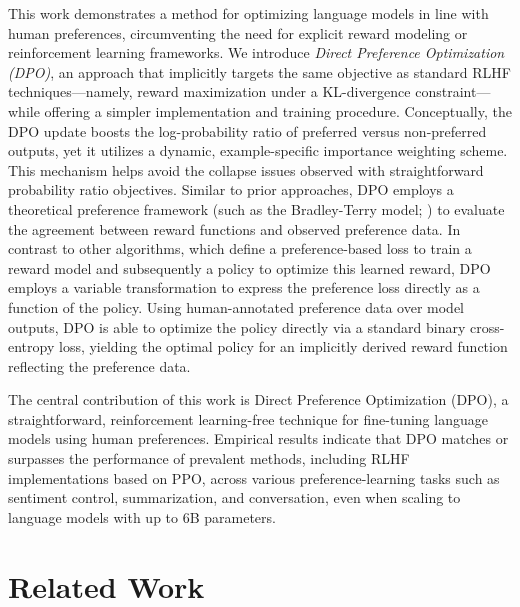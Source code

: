 This work demonstrates a method for optimizing language models in line with human preferences, circumventing the need for explicit reward modeling or reinforcement learning frameworks. We introduce \textit{Direct Preference Optimization (DPO)}, an approach that implicitly targets the same objective as standard RLHF techniques—namely, reward maximization under a KL-divergence constraint—while offering a simpler implementation and training procedure. Conceptually, the DPO update boosts the log-probability ratio of preferred versus non-preferred outputs, yet it utilizes a dynamic, example-specific importance weighting scheme. This mechanism helps avoid the collapse issues observed with straightforward probability ratio objectives. Similar to prior approaches, DPO employs a theoretical preference framework (such as the Bradley-Terry model; \cite{bradley1952rankanalysis}) to evaluate the agreement between reward functions and observed preference data. In contrast to other algorithms, which define a preference-based loss to train a reward model and subsequently a policy to optimize this learned reward, DPO employs a variable transformation to express the preference loss directly as a function of the policy. Using human-annotated preference data over model outputs, DPO is able to optimize the policy directly via a standard binary cross-entropy loss, yielding the optimal policy for an implicitly derived reward function reflecting the preference data.

The central contribution of this work is Direct Preference Optimization (DPO), a straightforward, reinforcement learning-free technique for fine-tuning language models using human preferences. Empirical results indicate that DPO matches or surpasses the performance of prevalent methods, including RLHF implementations based on PPO, across various preference-learning tasks such as sentiment control, summarization, and conversation, even when scaling to language models with up to 6B parameters.

\section{Related Work}

